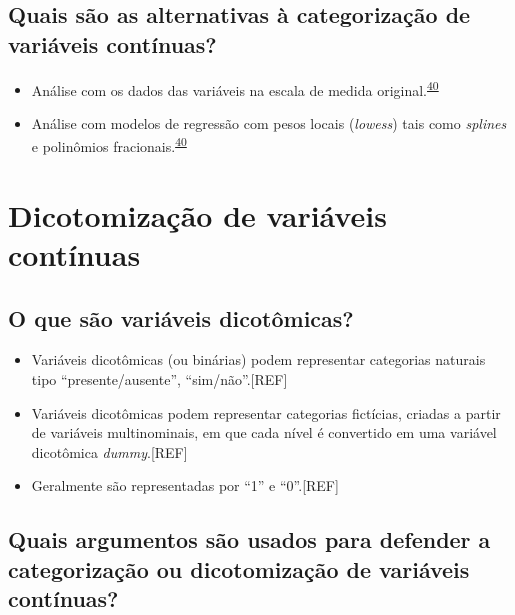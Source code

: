 \documentclass[
]{book}
\begin{document}
\hypertarget{quais-suxe3o-as-alternativas-uxe0-categorizauxe7uxe3o-de-variuxe1veis-contuxednuas}{%
\subsection{Quais são as alternativas à categorização de variáveis contínuas?}\label{quais-suxe3o-as-alternativas-uxe0-categorizauxe7uxe3o-de-variuxe1veis-contuxednuas}}

\begin{itemize}
\item
  Análise com os dados das variáveis na escala de medida original.\textsuperscript{\protect\hyperlink{ref-MacCallum2002}{40}}
\item
  Análise com modelos de regressão com pesos locais (\emph{lowess}) tais como \emph{splines} e polinômios fracionais.\textsuperscript{\protect\hyperlink{ref-MacCallum2002}{40}}
\end{itemize}

\hypertarget{dicotomizacao}{%
\section{Dicotomização de variáveis contínuas}\label{dicotomizacao}}

\hypertarget{o-que-suxe3o-variuxe1veis-dicotuxf4micas}{%
\subsection{O que são variáveis dicotômicas?}\label{o-que-suxe3o-variuxe1veis-dicotuxf4micas}}

\begin{itemize}
\item
  Variáveis dicotômicas (ou binárias) podem representar categorias naturais tipo ``presente/ausente'', ``sim/não''.{[}REF{]}
\item
  Variáveis dicotômicas podem representar categorias fictícias, criadas a partir de variáveis multinominais, em que cada nível é convertido em uma variável dicotômica \emph{dummy}.{[}REF{]}
\item
  Geralmente são representadas por ``1'' e ``0''.{[}REF{]}
\end{itemize}

\hypertarget{quais-argumentos-suxe3o-usados-para-defender-a-categorizauxe7uxe3o-ou-dicotomizauxe7uxe3o-de-variuxe1veis-contuxednuas}{%
\subsection{Quais argumentos são usados para defender a categorização ou dicotomização de variáveis contínuas?}\label{quais-argumentos-suxe3o-usados-para-defender-a-categorizauxe7uxe3o-ou-dicotomizauxe7uxe3o-de-variuxe1veis-contuxednuas}}
\end{document}
